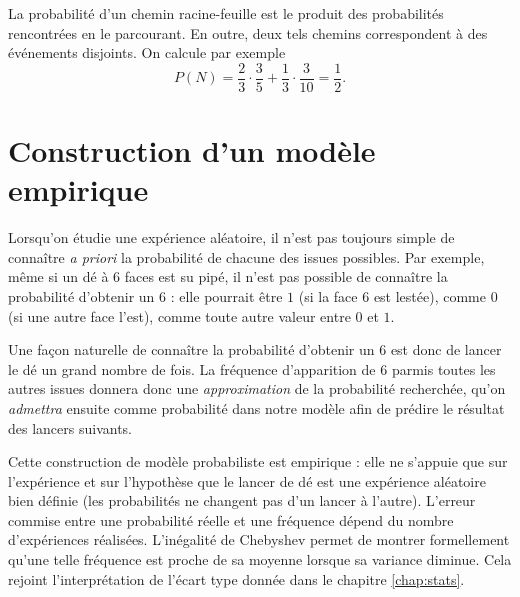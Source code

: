 {\begin{center}
	\end{center}
	La probabilité d'un chemin racine-feuille est le produit des probabilités rencontrées en le parcourant.
	En outre, deux tels chemins correspondent à des événements disjoints.
	On calcule par exemple
		\[ P(N) = \dfrac23 \cdot \dfrac35 + \dfrac13 \cdot \dfrac3{10} = \dfrac12. \]
}{}


\section{Construction d'un modèle empirique}

Lorsqu'on étudie une expérience aléatoire, il n'est pas toujours simple de connaître \emph{a priori} la probabilité de chacune des issues possibles.
Par exemple, même si un dé à $6$ faces est su pipé, il n'est pas possible de connaître la probabilité d'obtenir un $6$ : elle pourrait être $1$ (si la face $6$ est lestée), comme $0$ (si une autre face l'est), comme toute autre valeur entre $0$ et $1$.

Une façon naturelle de connaître la probabilité d'obtenir un $6$ est donc de lancer le dé un grand nombre de fois.
La fréquence d'apparition de $6$ parmis toutes les autres issues donnera donc une \emph{approximation} de la probabilité recherchée, qu'on \emph{admettra} ensuite comme probabilité dans notre modèle afin de prédire le résultat des lancers suivants.

Cette construction de modèle probabiliste est empirique : elle ne s'appuie que sur l'expérience et sur l'hypothèse que le lancer de dé est une expérience aléatoire bien définie (les probabilités ne changent pas d'un lancer à l'autre).
L'erreur commise entre une probabilité réelle et une fréquence dépend du nombre d'expériences réalisées.
L'inégalité de Chebyshev permet de montrer formellement qu'une telle fréquence est proche de sa moyenne lorsque sa variance diminue.
Cela rejoint l'interprétation de l'écart type donnée dans le chapitre \ref{chap:stats}.

